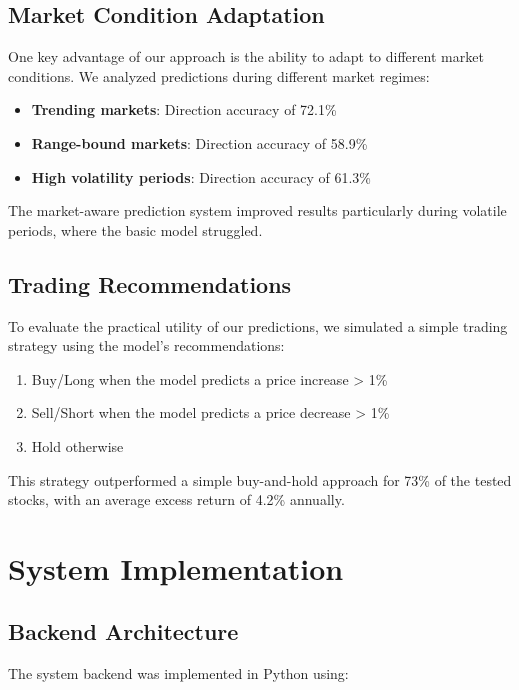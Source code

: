 \documentclass[conference]{IEEEtran}
\begin{document}
\subsection{Market Condition Adaptation}

One key advantage of our approach is the ability to adapt to different market conditions. We analyzed predictions during different market regimes:

\begin{itemize}
\item \textbf{Trending markets}: Direction accuracy of 72.1\%
\item \textbf{Range-bound markets}: Direction accuracy of 58.9\%
\item \textbf{High volatility periods}: Direction accuracy of 61.3\%
\end{itemize}

The market-aware prediction system improved results particularly during volatile periods, where the basic model struggled.

\subsection{Trading Recommendations}

To evaluate the practical utility of our predictions, we simulated a simple trading strategy using the model's recommendations:

\begin{enumerate}
\item Buy/Long when the model predicts a price increase > 1\%
\item Sell/Short when the model predicts a price decrease > 1\%
\item Hold otherwise
\end{enumerate}

This strategy outperformed a simple buy-and-hold approach for 73\% of the tested stocks, with an average excess return of 4.2\% annually.

\section{System Implementation}

\subsection{Backend Architecture}

The system backend was implemented in Python using:
\end{document}
